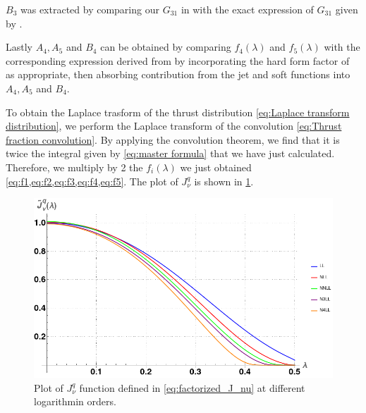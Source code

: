 \documentclass[../Tesi_Jiahao_Miao_986136.tex]{subfiles}
\begin{document}
$B_3$ was extracted by comparing our $G_{31}$ in  with the exact expression of $G_{31}$ given by \cite{Monni:2011gb}.

Lastly $A_4, A_5$ and $B_4$ can be obtained by comparing $f_4(\lambda)$ and $f_5(\lambda)$ with the corresponding expression derived from \cite{Ju_2023} by incorporating the hard form factor 
of \cite{chakraborty2022hbbarbvertexloopshard} as appropriate, then absorbing contribution from the jet and soft functions into $A_4,A_5$ and $B_4$.

To obtain the Laplace trasform of the thrust distribution \cref{eq:Laplace transform distribution}, 
we perform the Laplace transform of the convolution \cref{eq:Thrust fraction convolution}.
By applying the convolution theorem, we find that it is twice the integral given by \cref{eq:master formula} that we have just calculated. 
Therefore, we multiply by 2 the $f_i(\lambda)$ we just obtained \cref{eq:f1,eq:f2,eq:f3,eq:f4,eq:f5}. 
The plot of $J_\nu^q$ is shown in \cref{fig:J_nu}.

\begin{figure}[htbp]
    \centering
    \includegraphics[width=\textwidth]{figures/Laplace_J_orders.png}
    \caption{Plot of $J_\nu^q$ function defined in \cref{eq:factorized_J_nu} at different logarithmin orders.}
    \label{fig:J_nu}
\end{figure}
\end{document}
